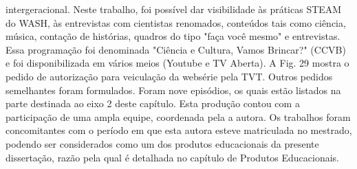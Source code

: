 \begin{itemize}
intergeracional. Neste trabalho, foi possível dar visibilidade às práticas STEAM do WASH,  às entrevistas com cientistas renomados, conteúdos tais como ciência, música, contação de histórias, quadros do tipo "faça você mesmo" e entrevistas. Essa programação foi denominada "Ciência e Cultura, Vamos Brincar?" (CCVB) e foi disponibilizada em vários meios (Youtube e TV Aberta). A Fig. 29 mostra o pedido de autorização para veiculação da websérie pela TVT. Outros pedidos semelhantes foram formulados. Foram nove episódios, os quais estão listados na parte destinada ao eixo 2 deste capítulo. Esta produção contou com a participação de uma ampla equipe, coordenada pela a autora. Os trabalhos foram concomitantes com o período em que esta autora esteve matriculada no mestrado, podendo ser considerados como um dos produtos educacionais da presente dissertação, razão pela qual é detalhada no capítulo de Produtos Educacionais.
\end{itemize}




